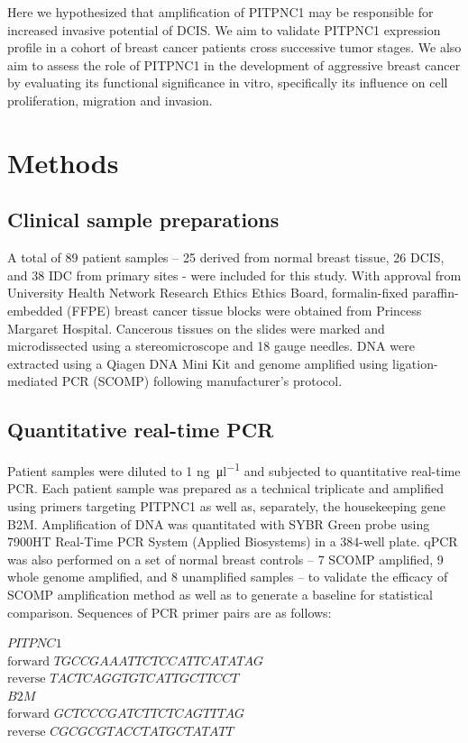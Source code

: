 \documentclass[10pt,letterpaper]{article}
\begin{document}
Here we hypothesized that amplification of PITPNC1 may be responsible for increased invasive potential of DCIS. We aim to validate PITPNC1 expression profile in a cohort of breast cancer patients cross successive tumor stages. We also aim to assess the role of PITPNC1 in the development of aggressive breast cancer by evaluating its functional significance in vitro, specifically its influence on cell proliferation, migration and invasion.

\section*{Methods}
\subsection*{Clinical sample preparations}
A total of 89 patient samples – 25 derived from normal breast tissue, 26 DCIS, and 38 IDC from primary sites - were included for this study.  With approval from University Health Network Research Ethics Ethics Board, formalin-fixed paraffin-embedded (FFPE) breast cancer tissue blocks were obtained from Princess Margaret Hospital. Cancerous tissues on the slides were marked and microdissected using a stereomicroscope and 18 gauge needles. DNA were extracted using a Qiagen DNA Mini Kit and genome amplified using ligation-mediated PCR (SCOMP) following manufacturer’s protocol.

\subsection*{Quantitative real-time PCR }
Patient samples were diluted to 1 \si{\nano\gram\per\micro\litre} and subjected to quantitative real-time PCR. Each patient sample was prepared as a technical triplicate and amplified using primers targeting PITPNC1 as well as, separately, the housekeeping gene B2M. Amplification of DNA was quantitated with SYBR Green probe using 7900HT Real-Time PCR System (Applied Biosystems) in a 384-well plate. qPCR was also performed on a set of normal breast controls – 7 SCOMP amplified, 9 whole genome amplified, and 8 unamplified samples – to validate the efficacy of SCOMP amplification method as well as to generate a baseline for statistical comparison. Sequences of PCR primer pairs are as follows:

\vspace*{1\baselineskip}
\hspace*{10mm} $PITPNC1$
\\\hspace*{20mm}$\text{forward } TGCCGAAATTCTCCATTCATATAG$
\\\hspace*{20mm}$\text{reverse } TACTCAGGTGTCATTGCTTCCT$
\\\hspace*{10mm} $B2M$
\\\hspace*{20mm}$\text{forward } GCTCCCGATCTTCTCAGTTTAG$
\\\hspace*{20mm}$\text{reverse } CGCGCGTACCTATGCTATATT$
\end{document}
